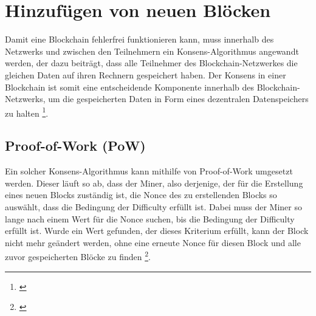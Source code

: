 \chapter{Hinzufügen von neuen Blöcken}\label{chp:aufbau-einer-blockchain}




Damit eine Blockchain fehlerfrei funktionieren kann, muss innerhalb des Netzwerks und zwischen den Teilnehmern ein Konsens-Algorithmus angewandt werden, der dazu beiträgt, dass alle Teilnehmer des Blockchain-Netzwerkes die gleichen Daten auf ihren Rechnern gespeichert haben. Der Konsens in einer Blockchain ist somit eine entscheidende Komponente innerhalb des Blockchain-Netzwerks, um die gespeicherten Daten in Form eines dezentralen Datenspeichers zu halten \footnote{\parencite[vgl.][S. 5]{Raikwar.2019}}. 

\section{Proof-of-Work (PoW)}\label{sec:proof-of-work}
Ein solcher Konsens-Algorithmus kann mithilfe von Proof-of-Work umgesetzt werden. Dieser läuft so ab, dass der Miner, also derjenige, der für die Erstellung eines neuen Blocks zuständig ist, die Nonce des zu erstellenden Blocks so auswählt, dass die Bedingung der Difficulty erfüllt ist. Dabei muss der Miner so lange nach einem Wert für die Nonce suchen, bis die Bedingung der Difficulty erfüllt ist. Wurde ein Wert gefunden, der dieses Kriterium erfüllt, kann der Block nicht mehr geändert werden, ohne eine erneute Nonce für diesen Block und alle zuvor gespeicherten Blöcke zu finden \footnote{\parencite[vgl.][S. 1546]{Bach.52018}}.


